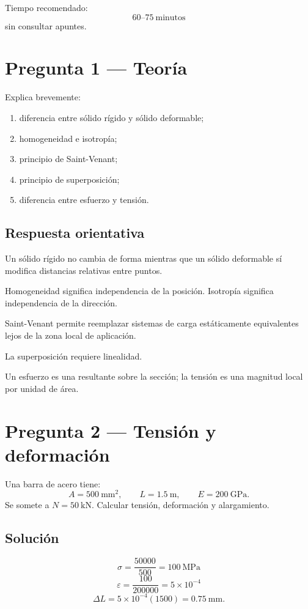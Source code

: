 
Tiempo recomendado:
\[
\boxed{60\text{--}75\ \text{minutos}}
\]
sin consultar apuntes.

\section*{Pregunta 1 --- Teoría}
Explica brevemente:
\begin{enumerate}[label=\alph*)]
  \item diferencia entre sólido rígido y sólido deformable;
  \item homogeneidad e isotropía;
  \item principio de Saint-Venant;
  \item principio de superposición;
  \item diferencia entre esfuerzo y tensión.
\end{enumerate}

\subsection*{Respuesta orientativa}
Un sólido rígido no cambia de forma mientras que un sólido deformable sí modifica distancias relativas entre puntos.

Homogeneidad significa independencia de la posición. Isotropía significa independencia de la dirección.

Saint-Venant permite reemplazar sistemas de carga estáticamente equivalentes lejos de la zona local de aplicación.

La superposición requiere linealidad.

Un esfuerzo es una resultante sobre la sección; la tensión es una magnitud local por unidad de área.

\section*{Pregunta 2 --- Tensión y deformación}
Una barra de acero tiene:
\[
A=\qty{500}{\milli\metre\squared},\qquad
L=\qty{1.5}{\metre},\qquad
E=\qty{200}{\giga\pascal}.
\]
Se somete a $N=\qty{50}{\kilo\newton}$. Calcular tensión, deformación y alargamiento.

\subsection*{Solución}
\[
\sigma=\frac{50000}{500}=\boxed{\qty{100}{\mega\pascal}}
\]
\[
\varepsilon=\frac{100}{200000}=\boxed{5\times10^{-4}}
\]
\[
\Delta L=5\times10^{-4}(1500)=\boxed{\qty{0.75}{\milli\metre}}.
\]

